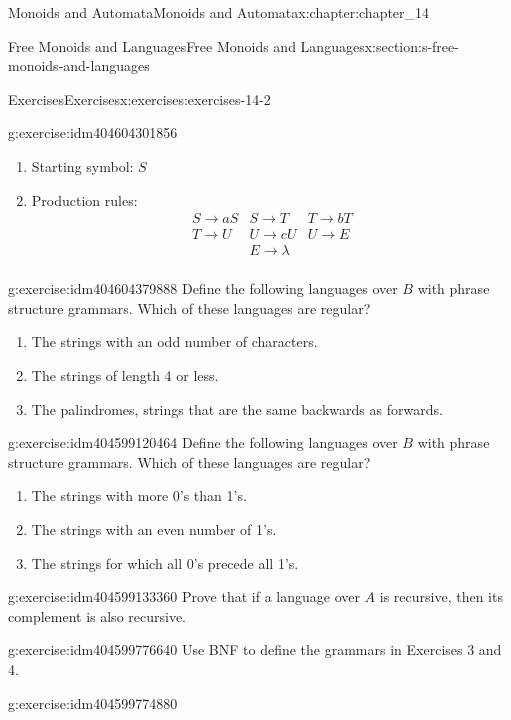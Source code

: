 \documentclass[twoside,10pt,]{book}
\numberwithin{equation}{section}
\begin{document}
\begin{chapterptx}{Monoids and Automata}{}{Monoids and Automata}{}{}{x:chapter:chapter_14}
\begin{sectionptx}{Free Monoids and Languages}{}{Free Monoids and Languages}{}{}{x:section:s-free-monoids-and-languages}
\begin{exercises-subsection}{Exercises}{}{Exercises}{}{}{x:exercises:exercises-14-2}
\begin{divisionexercise}{4}{}{}{g:exercise:idm404604301856}
\begin{enumerate}[label=(\alph*)]
\item{}Starting symbol: \(S\)%
\item{}Production rules:%
\begin{equation*}
\begin{array}{ccc}
S\to aS & S \to T & T\to bT\\
T\to U  & U \to cU & U \to E\\
& E\to \lambda &\\
\end{array}
\end{equation*}
%
\end{enumerate}
%
\end{divisionexercise}%
\begin{divisionexercise}{5}{}{}{g:exercise:idm404604379888}%
Define the following languages over \(B\) with phrase structure grammars. Which of these languages are regular?%
\begin{enumerate}[label=(\alph*)]
\item{}The strings with an odd number of characters.%
\item{}The strings of length 4 or less.%
\item{}The palindromes, strings that are the same backwards as forwards.%
\end{enumerate}
%
\end{divisionexercise}%
\begin{divisionexercise}{6}{}{}{g:exercise:idm404599120464}%
Define the following languages over \(B\) with phrase structure grammars. Which of these languages are regular?%
\begin{enumerate}[label=(\alph*)]
\item{}The strings with more 0's than 1's.%
\item{}The strings with an even number of 1's.%
\item{}The strings for which all 0's precede all 1's.%
\end{enumerate}
%
\end{divisionexercise}%
\begin{divisionexercise}{7}{}{}{g:exercise:idm404599133360}%
Prove that if a language over \(A\) is recursive, then its complement is also recursive.%
\end{divisionexercise}%
\begin{divisionexercise}{8}{}{}{g:exercise:idm404599776640}%
Use BNF to define the grammars in Exercises 3 and 4.%
\end{divisionexercise}%
\begin{divisionexercise}{9}{}{}{g:exercise:idm404599774880}%

\end{divisionexercise}
\end{exercises-subsection}
\end{sectionptx}
\end{chapterptx}
\end{document}
